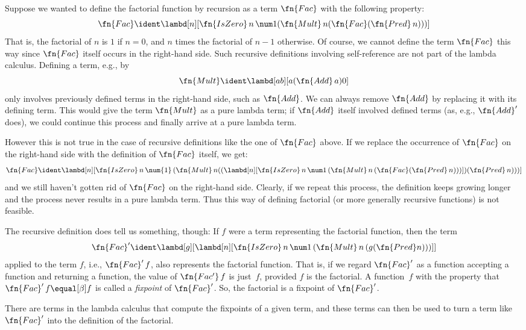 \documentclass[../../../include/open-logic-section]{subfiles}
\begin{document}


Suppose we wanted to define the factorial function by recursion as a
term $\fn{Fac}$ with the following property:
\[
\fn{Fac} \ident \lambd[n][\fn{IsZero}\, n\, \num 1 (\fn{Mult}\, n (\fn{Fac}(\fn{Pred} \, n)))]
\]
That is, the factorial of $n$ is $1$ if $n = 0$, and $n$ times the
factorial of $n-1$ otherwise.  Of course, we cannot define the term
$\fn{Fac}$ this way since $\fn{Fac}$ itself occurs in the right-hand
side. Such recursive definitions involving self-reference
are not part of the lambda calculus. Defining a term, e.g., by
\[
\fn{Mult} \ident \lambd[ab][a (\fn{Add}\, a) 0]
\]
only involves previously defined terms in the right-hand side, such as
$\fn{Add}$. We can always remove $\fn{Add}$ by replacing it with its
defining term.  This would give the term $\fn{Mult}$ as a pure lambda
term; if $\fn{Add}$ itself involved defined terms (as, e.g.,
$\fn{Add}'$ does), we could continue this process and finally arrive at
a pure lambda term.

However this is not true in the case of recursive definitions like the
one of $\fn{Fac}$ above. If we replace the occurrence of $\fn{Fac}$ on
the right-hand side with the definition of $\fn{Fac}$ itself, we get:
\[
\fn{Fac} \ident \lambd[n][\fn{IsZero}\, n\, \num{1}\, (\fn{Mult}\, n
  ((\lambd[n][\fn{IsZero} \, n \, \num 1\, (\fn{Mult}\, n\, (\fn{Fac}
    (\fn{Pred}\, n)))]) (\fn{Pred}\, n)))]
\]
and we still haven't gotten rid of $\fn{Fac}$ on the right-hand
side. Clearly, if we repeat this process, the definition keeps growing
longer and the process never results in a pure lambda term. Thus this
way of defining factorial (or more generally recursive functions)
is not feasible.

The recursive definition does tell us something, though: If $f$ were a
term representing the factorial function, then the term
\[
\fn{Fac}' \ident \lambd[g][\lambd[n][\fn{IsZero} \, n \, \num 1\, (\fn{Mult} \, n\, (g (\fn{Pred} n)))]]
\]
applied to the term $f$, i.e., $\fn{Fac}'\,f$, also represents the
factorial function.  That is, if we regard $\fn{Fac}'$ as a function
accepting a function and returning a function, the value of
$\fn{Fac'}\, f$ is just~$f$, provided $f$ is the factorial. A
function~$f$ with the property that $\fn{Fac}' \, f \equal[\beta] f$ is called
a \emph{fixpoint} of $\fn{Fac}'$. So, the factorial is a fixpoint of
$\fn{Fac}'$.

There are terms in the lambda calculus that compute the fixpoints of a
given term, and these terms can then be used to turn a term like
$\fn{Fac}'$ into the definition of the factorial. 
\end{document}
